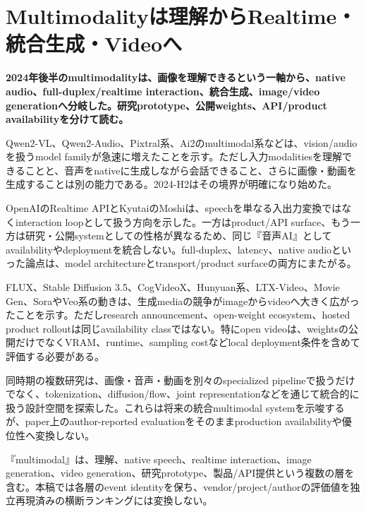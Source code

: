 \section{Multimodalityは理解からRealtime・統合生成・Videoへ}
\noindent\textbf{2024年後半のmultimodalityは、画像を理解できるという一軸から、native audio、full-duplex/realtime interaction、統合生成、image/video generationへ分岐した。研究prototype、公開weights、API/product availabilityを分けて読む。}\autocite{src-4a870e1e2c95,src-c5ed64e39d0c,src-f6c8da8253fb}

Qwen2-VL、Qwen2-Audio、Pixtral系、Ai2のmultimodal系などは、vision/audioを扱うmodel familyが急速に増えたことを示す。ただし入力modalitiesを理解できることと、音声をnativeに生成しながら会話できること、さらに画像・動画を生成することは別の能力である。2024-H2はその境界が明確になり始めた。\autocite{src-56b3abdc51a9,src-72d4a57e9c16,src-9f35f00f9f9c,src-d483c7d9838b,src-feb76866f5df}


OpenAIのRealtime APIとKyutaiのMoshiは、speechを単なる入出力変換ではなくinteraction loopとして扱う方向を示した。一方はproduct/API surface、もう一方は研究・公開systemとしての性格が異なるため、同じ『音声AI』としてavailabilityやdeploymentを統合しない。full-duplex、latency、native audioといった論点は、model architectureとtransport/product surfaceの両方にまたがる。\autocite{src-4a870e1e2c95,src-c5ed64e39d0c}


FLUX、Stable Diffusion 3.5、CogVideoX、Hunyuan系、LTX-Video、Movie Gen、SoraやVeo系の動きは、生成mediaの競争がimageからvideoへ大きく広がったことを示す。ただしresearch announcement、open-weight ecosystem、hosted product rolloutは同じavailability classではない。特にopen videoは、weightsの公開だけでなくVRAM、runtime、sampling costなどlocal deployment条件を含めて評価する必要がある。\autocite{src-06d2114e2823,src-2d134659d4de,src-d1b80acf98c2,src-d33cd3d41599,src-d50c19922f51,src-e91cbf23fde6,src-f6c8da8253fb}


同時期の複数研究は、画像・音声・動画を別々のspecialized pipelineで扱うだけでなく、tokenization、diffusion/flow、joint representationなどを通じて統合的に扱う設計空間を探索した。これらは将来の統合multimodal systemを示唆するが、paper上のauthor-reported evaluationをそのままproduction availabilityや優位性へ変換しない。\autocite{src-25c4073c2a29,src-5ff9bff435a6,src-680a61ed20c0,src-770e33132b09,src-e38a55668df9,src-e7d2578ccb4d,src-f6b059ed7fb2,src-fa0d8178b72a}


\begin{claimboundary}
『multimodal』は、理解、native speech、realtime interaction、image generation、video generation、研究prototype、製品/API提供という複数の層を含む。本稿では各層のevent identityを保ち、vendor/project/authorの評価値を独立再現済みの横断ランキングには変換しない。\autocite{src-c5ed64e39d0c}
\end{claimboundary}
